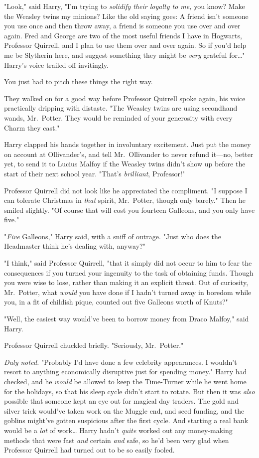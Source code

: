 "Look," said Harry, "I'm trying to \emph{solidify their loyalty to me,} you 
know? Make the Weasley twins my minions? Like the old saying goes: A friend 
isn't someone you use once and then throw away, a friend is someone you use 
over and over again. Fred and George are two of the most useful friends I have 
in Hogwarts, Professor Quirrell, and I plan to use them over and over again. So 
if you'd help me be Slytherin here, and suggest something they might be 
\emph{very} grateful for{\ldots}" Harry's voice trailed off invitingly.

You just had to pitch these things the right way.

They walked on for a good way before Professor Quirrell spoke again, his voice 
practically dripping with distaste. "The Weasley twins are using secondhand 
wands, Mr.~Potter. They would be reminded of your generosity with every Charm 
they cast."

Harry clapped his hands together in involuntary excitement. Just put the money 
on account at Ollivander's, and tell Mr.~Ollivander to never refund it---no, 
better yet, to send it to Lucius Malfoy if the Weasley twins didn't show up 
before the start of their next school year. "That's \emph{brilliant}, 
Professor!"

Professor Quirrell did not look like he appreciated the compliment. "I suppose 
I can tolerate Christmas in \emph{that} spirit, Mr.~Potter, though only 
barely." Then he smiled slightly. "Of course that will cost you fourteen 
Galleons, and you only have five."

"\emph{Five} Galleons," Harry said, with a sniff of outrage. "Just who does the 
Headmaster think he's dealing with, anyway?"

"I think," said Professor Quirrell, "that it simply did not occur to him to 
fear the consequences if you turned your ingenuity to the task of obtaining 
funds. Though you were wise to lose, rather than making it an explicit threat. 
Out of curiosity, Mr.~Potter, what \emph{would} you have done if I hadn't 
turned away in boredom while you, in a fit of childish pique, counted out five 
Galleons worth of Knuts?"

"Well, the easiest way would've been to borrow money from Draco Malfoy," said 
Harry.

Professor Quirrell chuckled briefly. "Seriously, Mr.~Potter."

\emph{Duly noted.} "Probably I'd have done a few celebrity appearances. I 
wouldn't resort to anything economically disruptive just for spending money." 
Harry had checked, and he \emph{would} be allowed to keep the Time-Turner while 
he went home for the holidays, so that his sleep cycle didn't start to rotate. 
But then it was \emph{also} possible that someone kept an eye out for magical 
day traders. The gold and silver trick would've taken work on the Muggle end, 
and seed funding, and the goblins might've gotten suspicious after the first 
cycle. And starting a real bank would be a \emph{lot} of work{\ldots} Harry 
hadn't \emph{quite} worked out any money-making methods that were fast 
\emph{and} certain \emph{and} safe, so he'd been very glad when Professor 
Quirrell had turned out to be so easily fooled.


